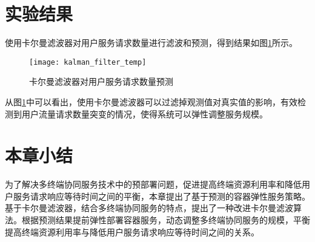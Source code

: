 
\section{实验结果}\label{sec:elastic_service_experiment_results}

使用卡尔曼滤波器对用户服务请求数量进行滤波和预测，得到结果如图\ref{fig:elastic_service_kalman_filter}所示。

\begin{figure}[htbp]
    \centering
    \texttt{[image: kalman\_filter\_temp]}\hfill\\[0.5cm]
  \caption{卡尔曼滤波器对用户服务请求数量预测}
  \label{fig:elastic_service_kalman_filter}
  \end{figure}

  从图\ref{fig:elastic_service_kalman_filter}中可以看出，使用卡尔曼滤波器可以过滤掉观测值对真实值的影响，有效检测到用户流量请求数量突变的情况，使得系统可以弹性调整服务规模。

\section{本章小结}\label{sec:elastic_service_summary}

为了解决多终端协同服务技术中的预部署问题，促进提高终端资源利用率和降低用户服务请求响应等待时间之间的平衡，本章提出了基于预测的容器弹性服务策略。基于卡尔曼滤波器，结合多终端协同服务的特点，提出了一种改进卡尔曼滤波算法。根据预测结果提前弹性部署容器服务，动态调整多终端协同服务的规模，平衡提高终端资源利用率与降低用户服务请求响应等待时间之间的关系。